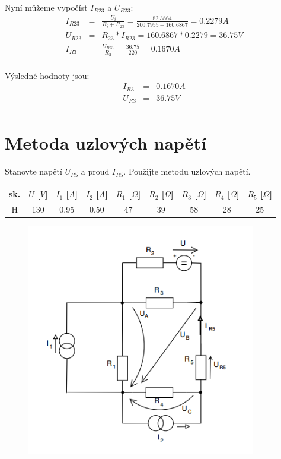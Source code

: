 \documentclass[a4paper,oneside,13pt]{article}
\begin{document}
	Nyní můžeme vypočíst $I_{R23}$ a $U_{R23}$:
	\begin{eqnarray*}
		I_{R23} & = & \frac{U_{i}}{R_{i} + R_{23}} = \frac{82.3864}{200.7955 + 160.6867} = 0.2279A \\
		U_{R23} & = & R_{23} * I_{R23} = 160.6867 * 0.2279 = 36.75V \\
		I_{R3} & = & \frac{U_{R23}}{R_{3}} = \frac{36.75}{220} = 0.1670A \\
	\end{eqnarray*}
	
	Výsledné hodnoty jsou:
	\begin{eqnarray*}
		I_{R3} & = & 0.1670A \\
		U_{R3} & = & 36.75V \\
	\end{eqnarray*}


	\newpage
	\section{Metoda uzlových napětí}
	
	Stanovte napětí $U_{R5}$ a proud $I_{R5}$. Použijte metodu uzlových napětí.
	
	\begin{table}[h]
		\begin{center}
			\begin{tabular}{|c|c|c|c|c|c|c|c|c|}
				\hline
				sk. & $U$ [$V$] & $I_{1}$ [$A$] & $I_{2}$ [$A$] & $R_{1}$ [$\Omega$] & $R_{2}$ [$\Omega$] & $R_{3}$ [$\Omega$]  & $R_{4}$ [$\Omega$] & $R_{5}$ [$\Omega$]\\
				\hline
				H & 130 & 0.95 & 0.50 & 47 & 39 & 58 & 28 & 25\\
				\hline
			\end{tabular}
		\end{center}
	\end{table}

	\begin{figure}[h]
		\begin{center}
			\includegraphics[width=10cm,keepaspectratio]{Napeti_3.PNG}
		\end{center}
	\end{figure}
\end{document}
